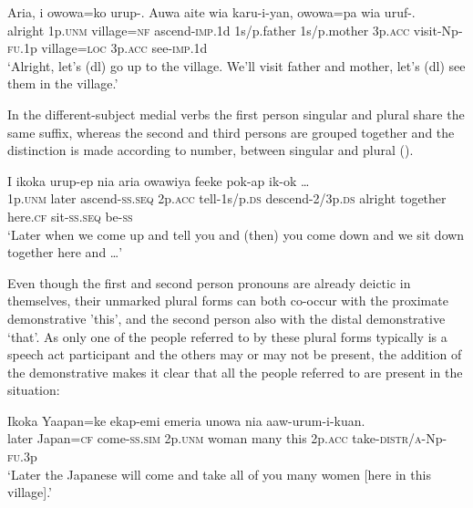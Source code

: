 \ea%
\label{ex:6:x1262}
\gll Aria,  i  owowa=ko  urup-.  Auwa  aite wia  karu-i-yan,  owowa=pa  wia  uruf-.\\
alright  1p.\textsc{unm}  village=\textsc{nf}  ascend-\textsc{imp}.1d  1s/p.father  1s/p.mother 3p.\textsc{acc}  visit-Np-\textsc{fu}.1p  village=\textsc{loc}  3p.\textsc{acc}  see-\textsc{imp}.1d\\
\glt `Alright, let's (dl) go up to the village. We'll visit father and mother, let's (dl) see them in the village.'
\z

In the different-subject medial verbs the first person singular and plural share the same suffix, whereas the second and third persons are grouped together and the distinction is made according to number, between singular and plural  ().

\ea%
\label{ex:6:x1263}
\gll I  ikoka  urup-ep  nia     aria  owawiya  feeke  pok-ap  ik-ok  {\dots}\\
1p.\textsc{unm}  later  ascend-\textsc{ss}.\textsc{seq}  2p.\textsc{acc}  tell-1s/p.\textsc{ds} descend-2/3p.\textsc{ds}  alright  together  here.\textsc{cf}  sit-\textsc{ss}.\textsc{seq}  be-\textsc{ss}\\
\glt `Later when we come up and tell you and (then) you come down and we sit down together here and {\dots}'
\z

Even though the first and second person pronouns are already deictic in themselves, their unmarked plural forms can both co-occur with the proximate demonstrative  'this',  
%
%
and the second person also with the distal demonstrative  `that'. As only one of the people referred to by these plural forms typically is a speech act participant and the others may or may not be present, the addition of the demonstrative  makes it clear that all the people referred to are present in the situation: 

\ea%
\label{ex:6:x1269}
\gll Ikoka  Yaapan=ke  ekap-emi    emeria  unowa   nia  aaw-urum-i-kuan.\\
later  Japan=\textsc{cf}  come-\textsc{ss}.\textsc{sim}  2p.\textsc{unm}  woman  many  this 2p.\textsc{acc}  take-\textsc{distr}/\textsc{a}-Np-\textsc{fu}.3p\\
\glt `Later the Japanese will come and take all of you many women [here in this village].'
\z

